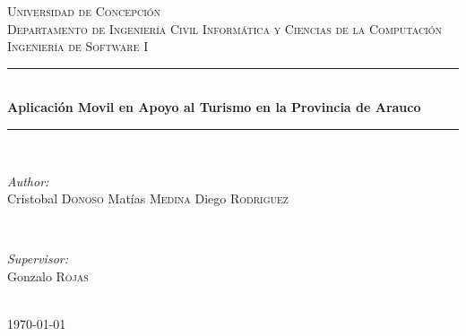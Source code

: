 \documentclass[12pt]{article}
\begin{document}
\begin{titlepage}

\newcommand{\HRule}{\rule{\linewidth}{0.5mm}} %

\center %
 

\textsc{\LARGE Universidad de Concepción}\\[1.5cm] %
\textsc{\Large Departamento de Ingeniería Civil Informática y Ciencias de la Computación}\\[0.5cm] %
\textsc{\large Ingeniería de Software I}\\[0.5cm] %


\HRule \\[0.4cm]
{ \huge \bfseries Aplicación Movil en Apoyo al Turismo en la Provincia de Arauco }\\[0.4cm] %
\HRule \\[1.5cm]
 

\begin{minipage}{0.4\textwidth}
\begin{flushleft} \large
\emph{Author:}\\
Cristobal \textsc{Donoso}
Matías \textsc{Medina}
Diego \textsc{Rodriguez}
\end{flushleft}
\end{minipage}
~
\begin{minipage}{0.4\textwidth}
\begin{flushright} \large
\emph{Supervisor:} \\
Gonzalo \textsc{Rojas} %
\end{flushright}
\end{minipage}\\[4cm]

{\large \today}\\[3cm] %
\vfill %
\end{titlepage}
\end{document}
